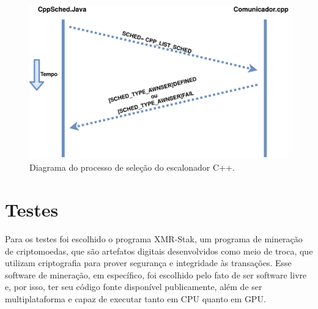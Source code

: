 \begin{figure}[htbp]
	\centerline{\includegraphics[width=13cm]{img/EscolhaDoEscalonadorCpp.png}}
	\caption{Diagrama do processo de seleção do escalonador C++.}
	\label{SelecaoEscalonador_UML}
\end{figure}



\section{Testes}

Para os testes foi escolhido o programa XMR-Stak\cite{xmr_stak}, um programa de mineração de criptomoedas, que são artefatos digitais desenvolvidos como meio de troca, que utilizam criptografia para prover segurança e integridade às transações\cite{crypto_currencies}. Esse software de mineração, em específico, foi escolhido pelo fato de ser software livre e, por isso, ter seu código fonte disponível publicamente, além de ser multiplataforma e capaz de executar tanto em \acrshort{CPU} quanto em \acrshort{GPU}.

